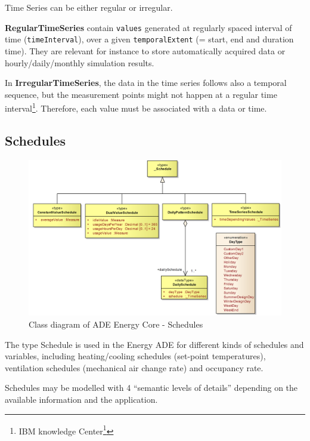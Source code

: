 \documentclass[a4paper,12pt]{article}
\renewcommand{\href}[2]{#2\footnote{\url{#1}}}
\begin{document}
Time Series can be either regular or irregular.

\textbf{RegularTimeSeries} contain \texttt{values} generated at
regularly spaced interval of time (\texttt{timeInterval}), over a given
\texttt{temporalExtent} (= start, end and duration time). They are
relevant for instance to store automatically acquired data or
hourly/daily/monthly simulation results.

In \textbf{IrregularTimeSeries}, the data in the time series follows
also a temporal sequence, but the measurement points might not happen at
a regular time interval\footnote{\href{http://www-01.ibm.com/support/knowledgecenter/SSCRJU_3.0.0/com.ibm.swg.im.infosphere.streams.timeseries-toolkit.doc/doc/timeseries-regular.html}{IBM
  knowledge Center}}. Therefore, each value must be associated with a
data or time.

\subsection{Schedules}\label{schedules}

\begin{figure}[htbp]
\centering
\includegraphics{fig/class_schedules.png}
\caption{Class diagram of ADE Energy Core - Schedules}
\end{figure}

The type Schedule is used in the Energy ADE for different kinds of
schedules and variables, including heating/cooling schedules (set-point
temperatures), ventilation schedules (mechanical air change rate) and
occupancy rate.

Schedules may be modelled with 4 ``semantic levels of details''
depending on the available information and the application.
\end{document}
